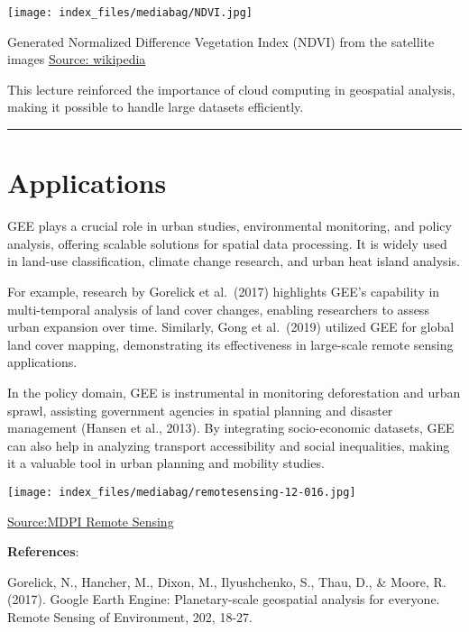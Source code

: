 \documentclass[
  letterpaper,
  DIV=11,
  numbers=noendperiod]{scrreprt}
\begin{document}
\texttt{[image: index\_files/mediabag/NDVI.jpg]}

Generated Normalized Difference Vegetation Index (NDVI) from the
satellite images
\href{https://upload.wikimedia.org/wikipedia/commons/a/ae/NDVI.jpg}{Source:
wikipedia}

This lecture reinforced the importance of cloud computing in geospatial
analysis, making it possible to handle large datasets efficiently.

\begin{center}\rule{0.5\linewidth}{0.5pt}\end{center}

\section{Applications}\label{applications-2}

GEE plays a crucial role in urban studies, environmental monitoring, and
policy analysis, offering scalable solutions for spatial data
processing. It is widely used in land-use classification, climate change
research, and urban heat island analysis.

For example, research by Gorelick et al.~(2017) highlights GEE's
capability in multi-temporal analysis of land cover changes, enabling
researchers to assess urban expansion over time. Similarly, Gong et
al.~(2019) utilized GEE for global land cover mapping, demonstrating its
effectiveness in large-scale remote sensing applications.

In the policy domain, GEE is instrumental in monitoring deforestation
and urban sprawl, assisting government agencies in spatial planning and
disaster management (Hansen et al., 2013). By integrating socio-economic
datasets, GEE can also help in analyzing transport accessibility and
social inequalities, making it a valuable tool in urban planning and
mobility studies.

\texttt{[image: index\_files/mediabag/remotesensing-12-016.jpg]}

\href{https://www.mdpi.com/remotesensing/remotesensing-12-01655/article_deploy/html/images/remotesensing-12-01655-g007-550.jpg}{Source:MDPI
Remote Sensing}

\textbf{References}:

Gorelick, N., Hancher, M., Dixon, M., Ilyushchenko, S., Thau, D., \&
Moore, R. (2017). Google Earth Engine: Planetary-scale geospatial
analysis for everyone. Remote Sensing of Environment, 202, 18-27.
\end{document}
